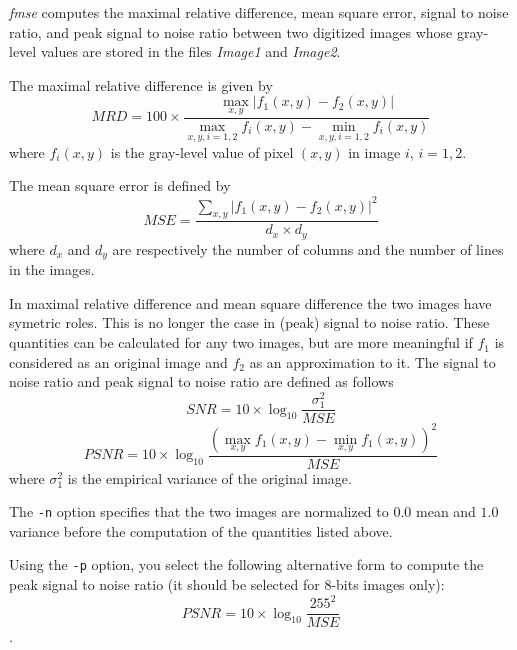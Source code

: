 {\em fmse} computes the maximal relative difference, mean square error, signal to noise ratio, and peak signal to noise ratio between two digitized images whose gray-level values are stored in the files {\em Image1} and {\em Image2}. 

The maximal relative difference is given by 
\[
MRD = 100 \times \frac{\max_{x,y}|f_{1}(x,y) - f_{2}(x,y)|}{\max_{x,y,i=1,2}f_{i}(x,y) - \min_{x,y,i=1,2}f_{i}(x,y)}
\]
where $f_{i}(x,y)$ is the gray-level value of pixel $(x,y)$ in image $i$, $i=1,2$. 

The mean square error is defined by 
\[
MSE = \frac{\sum_{x,y}|f_{1}(x,y) - f_{2}(x,y)|^{2}}{d_{x} \times d_{y}}
\]
where $d_{x}$ and $d_{y}$ are respectively the number of columns and the number of lines in the images.

In maximal relative difference and mean square difference the two images have symetric roles. This is no longer the case in (peak) signal to noise ratio. 
These quantities can be calculated for any two images, but are more meaningful if $f_{1}$ is considered as an original image and $f_{2}$ as an approximation to it. The signal to noise ratio and peak signal to noise ratio are defined as follows
\[
SNR = 10 \times \log_{10} \frac{\sigma_{1}^{2}}{MSE} 
\]
\[
PSNR = 10 \times \log_{10} \frac{(\max_{x,y}f_{1}(x,y) - \min_{x,y}f_{1}(x,y))^{2}}{MSE}
\]
where $\sigma_{1}^{2}$ is the empirical variance of the original image.

The \verb+-n+ option specifies that the two images are normalized to $0.0$ mean and $1.0$ variance before the computation of the quantities listed above.

Using the \verb+-p+ option, you select the following alternative form to compute
the peak signal to noise ratio (it should be selected for 8-bits images only):
\[
PSNR = 10 \times \log_{10} \frac{255^{2}}{MSE}
\].


